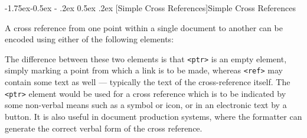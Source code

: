 \documentclass[11pt,twoside]{article}\makeatletter
\makeatletter
\renewcommand\subsection{\@startsection{subsection}{2}{\z@}%
     {-1.75ex\@plus -0.5ex \@minus- .2ex}%
     {0.5ex \@plus .2ex}%
     {\reset@font\Large\sffamily}}
\makeatother
\begin{document}
\subsection[{Simple Cross References}]{Simple Cross References}\label{ptrs}\par
A cross reference from one point within a single document to another can be encoded using either of the following elements: \par
The difference between these two elements is that \texttt{<ptr>} is an empty element, simply marking a point from which a link is to be made, whereas \texttt{<ref>} may contain some text as well — typically the text of the cross-reference itself. The \texttt{<ptr>} element would be used for a cross reference which is to be indicated by some non-verbal means such as a symbol or icon, or in an electronic text by a button. It is also useful in document production systems, where the formatter can generate the correct verbal form of the cross reference.\par
\end{document}
